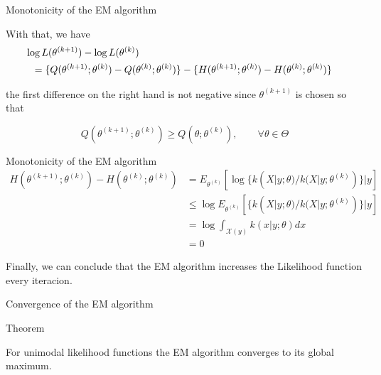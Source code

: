 \documentclass[11pt]{beamer}
\begin{document}
\begin{frame}{Monotonicity of the EM algorithm}

With that, we have 
\begin{equation}
\begin{split} 
\log L(\theta^{(k+1)}) - \log L(\theta^{(k)}) \\ &\hspace{-3.8cm} = \{ Q(\theta^{(k+1)};\theta^{(k)}) - Q(\theta^{(k)};\theta^{(k)}) \} - \{ H(\theta^{(k+1)};\theta^{(k)}) - H(\theta^{(k)};\theta^{(k)}) \}
\end{split}
\end{equation}

\pause
the first difference on the right hand is not negative since $\theta^{(k+1)}$ is chosen so that 

$$ Q(\theta^{(k+1)};\theta^{(k)}) \geq Q(\theta;\theta^{(k)}), \qquad \forall \theta \in \Theta  $$
%
%


%
%

\end{frame}


\begin{frame}{Monotonicity of the EM algorithm}
\begin{equation}
\begin{split} 
H(\theta^{(k+1)};\theta^{(k)}) - H(\theta^{(k)};\theta^{(k)}) 
& = E_{\theta^{(k)}}[\log \{k(X|y;\theta)/k(X|y;\theta^{(k)})\} | y] \\
& \leq \log E_{\theta^{(k)}}[\{k(X|y;\theta)/k(X|y;\theta^{(k)})\} | y]\\
&= \log \int_{\mathcal{X}(y)} k(x|y;\theta)dx \\
&= 0 
\end{split}
\end{equation}
\pause

Finally, we can conclude that the EM algorithm increases the Likelihood function every iteracion.

\end{frame}


\begin{frame}{Convergence of the EM algorithm}

\begin{block}{Theorem}

For unimodal likelihood functions the EM algorithm converges to its global maximum.

\end{block}

\end{frame}
\end{document}
